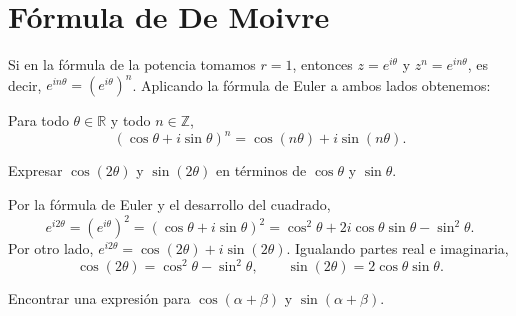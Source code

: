 \documentclass[12pt,a4paper]{book}
\begin{document}
  \section{Fórmula de De Moivre}

  Si en la fórmula de la potencia tomamos $r=1$, entonces $z=e^{i\theta}$ y $z^n=e^{in\theta}$, es decir, $e^{in\theta}=(e^{i\theta})^n$. Aplicando la fórmula de Euler a ambos lados obtenemos:

  \begin{teorema}
    Para todo $\theta\in\mathbb{R}$ y todo $n\in\mathbb{Z}$,
    \begin{equation*}
      (\cos\theta+i\sin\theta)^n=\cos(n\theta)+i\sin(n\theta).
    \end{equation*}
  \end{teorema}

  \begin{ejercicio}
    Expresar $\cos(2\theta)$ y $\sin(2\theta)$ en términos de $\cos\theta$ y $\sin\theta$.
  \end{ejercicio}

  \begin{solucion}
    Por la fórmula de Euler y el desarrollo del cuadrado,
    \begin{equation*}
      e^{i2\theta}=(e^{i\theta})^2=(\cos\theta+i\sin\theta)^2=\cos^2\theta+2i\cos\theta\sin\theta-\sin^2\theta.
    \end{equation*}
    Por otro lado, $e^{i2\theta}=\cos(2\theta)+i\sin(2\theta)$. Igualando partes real e imaginaria,
    \begin{equation*}
      \cos(2\theta)=\cos^2\theta-\sin^2\theta, \qquad \sin(2\theta)=2\cos\theta\sin\theta.
    \end{equation*}
  \end{solucion}

  \begin{ejercicio}
    Encontrar una expresión para $\cos(\alpha+\beta)$ y $\sin(\alpha+\beta)$.
  \end{ejercicio}
\end{document}
